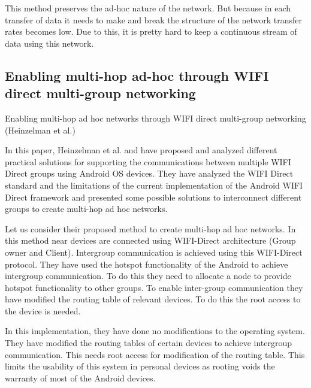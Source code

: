 \vspace{12pt}

This method preserves the ad-hoc nature of the network. But because in each transfer of data it needs to make and break the structure of the network transfer rates becomes low. Due to this, it is pretty hard to keep a continuous stream of data using this network.

\vspace{12pt}



\subsection{Enabling multi-hop ad-hoc through  WIFI  direct multi-group networking}{Enabling multi-hop ad hoc networks through  WIFI  direct multi-group networking (Heinzelman et al.)\cite{wifi-direct_and_hotspot} }

\vspace{12pt}

In this paper, Heinzelman et al.\cite{wifi-direct_and_hotspot} and have proposed and analyzed different practical solutions for supporting the communications between multiple WIFI  Direct groups using Android OS devices. They have analyzed the WIFI Direct standard and the limitations of the current implementation of the Android WIFI  Direct framework and presented some possible solutions to interconnect different groups to create multi-hop ad hoc networks.

\vspace{12pt}

Let us consider their proposed method to create multi-hop ad hoc networks. In this method near devices are connected using WIFI-Direct architecture (Group owner and Client). Intergroup communication is achieved using this WIFI-Direct protocol. They have used the hotspot functionality of the Android to achieve intergroup communication. To do this they need to allocate a node to provide hotspot functionality to other groups. To enable inter-group communication they have modified the routing table of relevant devices. To do this the root access to the device is needed.
\vspace{12pt}


In this implementation, they have done no modifications to the operating system. They have modified the routing tables of certain devices to achieve intergroup communication. This needs root access for modification of the routing table. This limits the usability of this system in personal devices as rooting voids the warranty of most of the Android devices.

